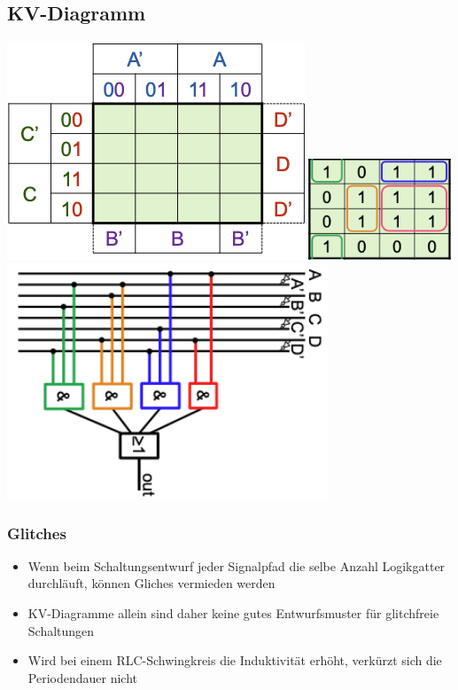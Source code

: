 \documentclass[8pt,a4paper]{scrartcl}
\begin{document}
\begin{multicols*}{3}
				\subsection{KV-Diagramm}
					\includegraphics[height=6.5cm]{img/kv1.png} 
					\includegraphics[height=3cm]{img/kv2.png} 
					\includegraphics[height=7cm]{img/kv3.png} 
				
				\subsubsection{Glitches}
					\begin{itemize}\itemsep0pt
						\item Wenn beim Schaltungsentwurf jeder Signalpfad die selbe Anzahl Logikgatter durchläuft, können Gliches vermieden werden
						\item KV-Diagramme allein sind daher keine gutes Entwurfsmuster für glitchfreie Schaltungen
						\item Wird bei einem RLC-Schwingkreis die Induktivität erhöht, verkürzt sich die Periodendauer nicht
					\end{itemize}



\end{multicols*}
\end{document}
